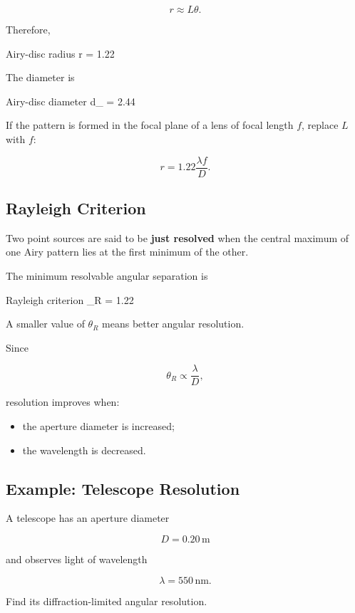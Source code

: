 \documentclass{studentnotes}
\begin{document}
\[
    r\approx L\theta.
\]

Therefore,

\begin{namedformula}{Airy-disc radius}
    r
    =
    1.22
\end{namedformula}

The diameter is

\begin{namedformula}{Airy-disc diameter}
    d_{}
    =
    2.44
\end{namedformula}

If the pattern is formed in the focal plane of a lens of focal length \(f\), replace \(L\) with \(f\):

\[
    r
    =
    1.22\frac{\lambda f}{D}.
\]

\subsection{Rayleigh Criterion}

Two point sources are said to be \textbf{just resolved} when the central maximum of one Airy pattern lies at the first minimum of the other.

The minimum resolvable angular separation is

\begin{namedformula}{Rayleigh criterion}
    \theta_R
    =
    1.22
\end{namedformula}

\begin{importantnote}
    A smaller value of \(\theta_R\) means better angular resolution.
\end{importantnote}

Since

\[
    \theta_R\propto\frac{\lambda}{D},
\]

resolution improves when:

\begin{itemize}
    \item the aperture diameter is increased;
    \item the wavelength is decreased.
\end{itemize}

\subsection{Example: Telescope Resolution}

\begin{example}
    A telescope has an aperture diameter

    \[
        D=0.20\,\text{m}
    \]

    and observes light of wavelength

    \[
        \lambda=550\,\text{nm}.
    \]

    Find its diffraction-limited angular resolution.
\end{example}
\end{document}
